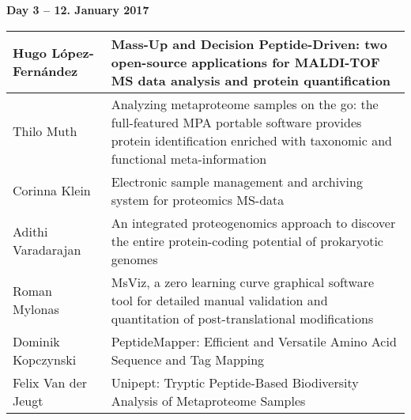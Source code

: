 \noindent\textbf{Day 3 -- 12. January 2017}

\begin{table}[!h]
  \centering
  \begin{tabular}{ | L{0.23\textwidth} | L{0.7\textwidth} | }
    \hline
    Hugo López-Fernández  & Mass-Up and Decision Peptide-Driven: two open-source applications for MALDI-TOF MS data analysis and protein quantification                                               \\
    \hline
    Thilo Muth            & Analyzing metaproteome samples on the go: the full-featured MPA portable software provides protein identification enriched with taxonomic and functional meta-information \\
    \hline
    Corinna Klein         & Electronic sample management and archiving system for proteomics MS-data                                                                                                  \\
    \hline
    Adithi Varadarajan    & An integrated proteogenomics approach to discover the entire protein-coding potential of prokaryotic genomes                                                              \\
    \hline
    Roman Mylonas         & MsViz, a zero learning curve graphical software tool for detailed manual validation and quantitation of post-translational modifications                                  \\
    \hline
    Dominik Kopczynski    & PeptideMapper: Efficient and Versatile Amino Acid Sequence and Tag Mapping                                                                                                \\
    \hline
    Felix Van der Jeugt   & Unipept: Tryptic Peptide-Based Biodiversity Analysis of Metaproteome Samples                                                                                              \\
    \hline
  \end{tabular}
\end{table}
